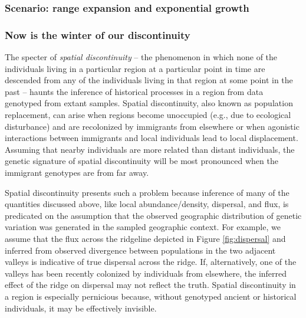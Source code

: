 \documentclass{ar-1col}
\newcommand{\plr}[1]{{\color{green}{#1}}}
\newcommand{\todo}[1]{{\textbf{\color{red}{#1}}}}
\begin{document}

\subsubsection{Scenario: range expansion and exponential growth}

\todo{
Consider triaging?  Feels like some of it is covered between the refugium scenario and the pop size change scenario, 
although not the surfing part.
%
%
\begin{itemize}
\item        - Where did the range expansion originate?
\item        - How fast did it spread?
\item        - How much surfing was there on the wave front?
\item        - can you tell the difference between source-sink dynamics and a range expansion?
\end{itemize}
}

%       

\subsubsection{Now is the winter of our discontinuity}

The specter of \textit{spatial discontinuity} --
the phenomenon in which none of the individuals 
living in a particular region at a particular point in time 
are descended from any of the individuals living in that region 
at some point in the past
-- haunts the inference of historical processes in a region 
from data genotyped from extant samples.
Spatial discontinuity, 
also known as population replacement, 
can arise when regions become unoccupied
(e.g., due to ecological disturbance) 
and are recolonized by immigrants from elsewhere or 
when agonistic interactions between immigrants and local individuals 
lead to local displacement. 
Assuming that nearby individuals are more related than distant individuals, 
the genetic signature of spatial discontinuity will be most pronounced 
when the immigrant genotypes are from far away.

Spatial discontinuity presents such a problem because 
inference of many of the quantities discussed above, 
like local abundance/density, dispersal, and flux, 
is predicated on the assumption that 
the observed geographic distribution of genetic variation 
was generated in the sampled geographic context.
For example, 
we assume that the flux across the ridgeline 
depicted in Figure \ref{fig:dispersal}
and inferred from observed divergence 
between populations in the two adjacent valleys 
is indicative of true dispersal across the ridge.
If, alternatively, one of the valleys 
has been recently colonized by individuals from elsewhere, 
the inferred effect of the ridge on dispersal may not reflect the truth.
Spatial discontinuity in a region is especially pernicious because, 
without genotyped ancient or historical individuals, 
it may be effectively invisible.
\end{document}
